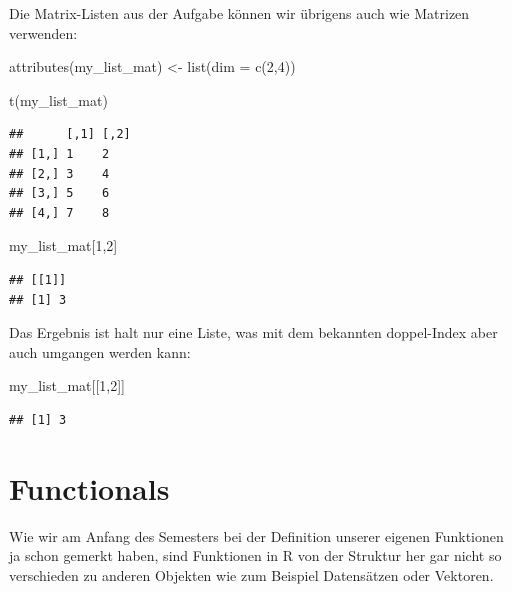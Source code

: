 \documentclass[
]{book}
\newenvironment{Shaded}{\begin{snugshade}}{\end{snugshade}}
\newcommand{\AttributeTok}[1]{\textcolor[rgb]{0.77,0.63,0.00}{#1}}
\newcommand{\DecValTok}[1]{\textcolor[rgb]{0.00,0.00,0.81}{#1}}
\newcommand{\FunctionTok}[1]{\textcolor[rgb]{0.00,0.00,0.00}{#1}}
\newcommand{\NormalTok}[1]{#1}
\newcommand{\OtherTok}[1]{\textcolor[rgb]{0.56,0.35,0.01}{#1}}
\begin{document}
Die Matrix-Listen aus der Aufgabe können wir übrigens auch wie Matrizen verwenden:

\begin{Shaded}
\begin{Highlighting}[]
\FunctionTok{attributes}\NormalTok{(my\_list\_mat) }\OtherTok{\textless{}{-}} \FunctionTok{list}\NormalTok{(}\AttributeTok{dim =} \FunctionTok{c}\NormalTok{(}\DecValTok{2}\NormalTok{,}\DecValTok{4}\NormalTok{))}

\FunctionTok{t}\NormalTok{(my\_list\_mat)}
\end{Highlighting}
\end{Shaded}

\begin{verbatim}
##      [,1] [,2]
## [1,] 1    2   
## [2,] 3    4   
## [3,] 5    6   
## [4,] 7    8
\end{verbatim}

\begin{Shaded}
\begin{Highlighting}[]
\NormalTok{my\_list\_mat[}\DecValTok{1}\NormalTok{,}\DecValTok{2}\NormalTok{]}
\end{Highlighting}
\end{Shaded}

\begin{verbatim}
## [[1]]
## [1] 3
\end{verbatim}

Das Ergebnis ist halt nur eine Liste, was mit dem bekannten doppel-Index aber auch umgangen werden kann:

\begin{Shaded}
\begin{Highlighting}[]
\NormalTok{my\_list\_mat[[}\DecValTok{1}\NormalTok{,}\DecValTok{2}\NormalTok{]]}
\end{Highlighting}
\end{Shaded}

\begin{verbatim}
## [1] 3
\end{verbatim}

\hypertarget{functionals}{%
\chapter{Functionals}\label{functionals}}

Wie wir am Anfang des Semesters bei der Definition unserer eigenen Funktionen ja schon gemerkt haben, sind Funktionen in R von der Struktur her gar nicht so verschieden zu anderen Objekten wie zum Beispiel Datensätzen oder Vektoren.
\end{document}

